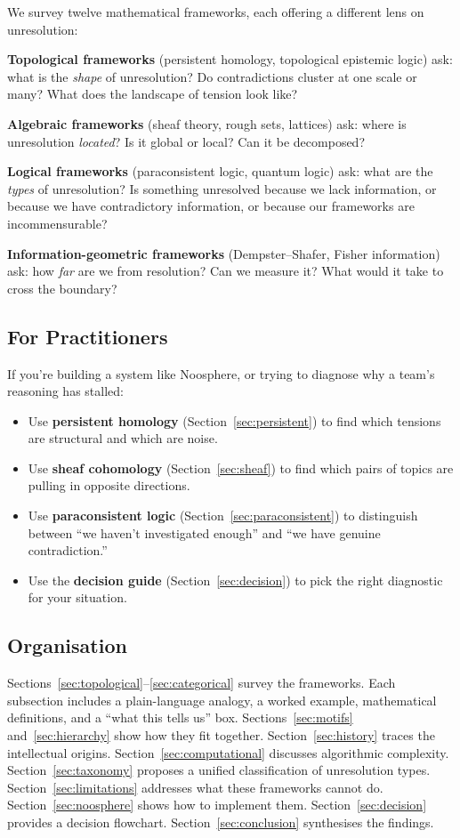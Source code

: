 \documentclass[11pt,letterpaper]{article}
\theoremstyle{definition}
\theoremstyle{remark}
\begin{document}
We survey twelve mathematical frameworks, each offering a different lens on unresolution:

\textbf{Topological frameworks} (persistent homology, topological epistemic logic) ask: what is the \emph{shape} of unresolution? Do contradictions cluster at one scale or many? What does the landscape of tension look like?

\textbf{Algebraic frameworks} (sheaf theory, rough sets, lattices) ask: where is unresolution \emph{located}? Is it global or local? Can it be decomposed?

\textbf{Logical frameworks} (paraconsistent logic, quantum logic) ask: what are the \emph{types} of unresolution? Is something unresolved because we lack information, or because we have contradictory information, or because our frameworks are incommensurable?

\textbf{Information-geometric frameworks} (Dempster--Shafer, Fisher information) ask: how \emph{far} are we from resolution? Can we measure it? What would it take to cross the boundary?

\subsection*{For Practitioners}

If you're building a system like Noosphere, or trying to diagnose why a team's reasoning has stalled:

\begin{itemize}
\item Use \textbf{persistent homology} (Section~\ref{sec:persistent}) to find which tensions are structural and which are noise.
\item Use \textbf{sheaf cohomology} (Section~\ref{sec:sheaf}) to find which pairs of topics are pulling in opposite directions.
\item Use \textbf{paraconsistent logic} (Section~\ref{sec:paraconsistent}) to distinguish between ``we haven't investigated enough'' and ``we have genuine contradiction.''
\item Use the \textbf{decision guide} (Section~\ref{sec:decision}) to pick the right diagnostic for your situation.
\end{itemize}

\subsection*{Organisation}

Sections~\ref{sec:topological}--\ref{sec:categorical} survey the frameworks. Each subsection includes a plain-language analogy, a worked example, mathematical definitions, and a ``what this tells us'' box. Sections~\ref{sec:motifs} and~\ref{sec:hierarchy} show how they fit together. Section~\ref{sec:history} traces the intellectual origins. Section~\ref{sec:computational} discusses algorithmic complexity. Section~\ref{sec:taxonomy} proposes a unified classification of unresolution types. Section~\ref{sec:limitations} addresses what these frameworks cannot do. Section~\ref{sec:noosphere} shows how to implement them. Section~\ref{sec:decision} provides a decision flowchart. Section~\ref{sec:conclusion} synthesises the findings.
\end{document}
